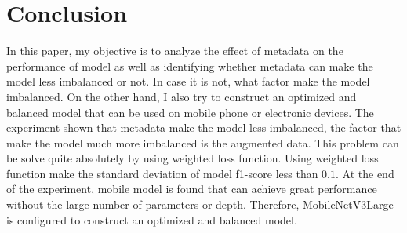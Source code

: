 \section{Conclusion}
In this paper, my objective is to analyze the effect of metadata on the performance of model as well as identifying whether metadata can make the model less imbalanced or not. In case it is not, what factor make the model imbalanced. On the other hand, I also try to construct an optimized and balanced model that can be used on mobile phone or electronic devices. The experiment shown that metadata make the model less imbalanced, the factor that make the model much more imbalanced is the augmented data. This problem can be solve quite absolutely by using weighted loss function. Using weighted loss function make the standard deviation of model f1-score less than $0.1$. At the end of the experiment, mobile model is found that can achieve great performance without the large number of parameters or depth. Therefore, MobileNetV3Large is configured to construct an optimized and balanced model. 
\clearpage
\pagebreak

